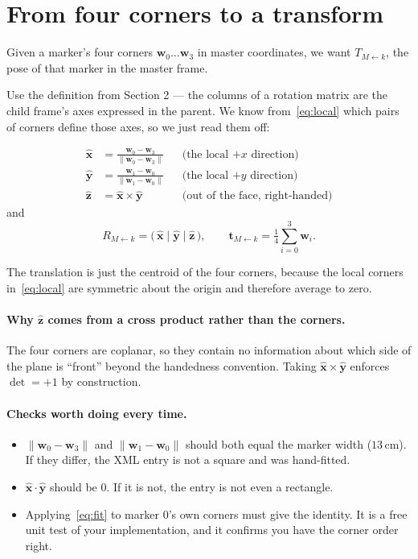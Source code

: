 \documentclass[11pt,a4paper]{article}
\newcommand{\T}[2]{T_{#1 \leftarrow #2}}   %
\newcommand{\R}[2]{R_{#1 \leftarrow #2}}
\newcommand{\vt}[1]{\mathbf{#1}}
\newcommand{\xh}{\hat{\vt{x}}}
\newcommand{\yh}{\hat{\vt{y}}}
\newcommand{\zh}{\hat{\vt{z}}}
\begin{document}
\section{From four corners to a transform}
\label{sec:corners2T}

Given a marker's four corners $\vt{w}_0 \ldots \vt{w}_3$ in master coordinates, we want
$\T{M}{k}$, the pose of that marker in the master frame.

Use the definition from Section 2 --- the columns of a rotation matrix are the child
frame's axes expressed in the parent. We know from~\eqref{eq:local} which pairs of
corners define those axes, so we just read them off:

\begin{align}
  \xh &= \frac{\vt{w}_0 - \vt{w}_3}{\lVert \vt{w}_0 - \vt{w}_3 \rVert}
        &&\text{(the local $+x$ direction)} \label{eq:xax}\\[2pt]
  \yh &= \frac{\vt{w}_1 - \vt{w}_0}{\lVert \vt{w}_1 - \vt{w}_0 \rVert}
        &&\text{(the local $+y$ direction)} \label{eq:yax}\\[2pt]
  \zh &= \xh \times \yh
        &&\text{(out of the face, right-handed)} \label{eq:zax}
\end{align}
and
\begin{equation}
  \R{M}{k} = \bigl(\, \xh \;\big|\; \yh \;\big|\; \zh \,\bigr),
  \qquad
  \vt{t}_{M\leftarrow k} = \tfrac{1}{4}\textstyle\sum_{i=0}^{3} \vt{w}_i .
  \label{eq:fit}
\end{equation}

The translation is just the centroid of the four corners, because the local corners
in~\eqref{eq:local} are symmetric about the origin and therefore average to zero.

\paragraph{Why $\zh$ comes from a cross product rather than the corners.} The four
corners are coplanar, so they contain no information about which side of the plane is
``front'' beyond the handedness convention. Taking $\xh \times \yh$ enforces
$\det = +1$ by construction.

\paragraph{Checks worth doing every time.}
\begin{itemize}[leftmargin=*,itemsep=1pt]
\item $\lVert \vt{w}_0 - \vt{w}_3 \rVert$ and $\lVert \vt{w}_1 - \vt{w}_0 \rVert$ should
      both equal the marker width ($13$\,cm). If they differ, the XML entry is not a
      square and was hand-fitted.
\item $\xh \cdot \yh$ should be $0$. If it is not, the entry is not even a rectangle.
\item Applying~\eqref{eq:fit} to marker 0's own corners must give the identity. It is a
      free unit test of your implementation, and it confirms you have the corner order
      right.
\end{itemize}
\end{document}
